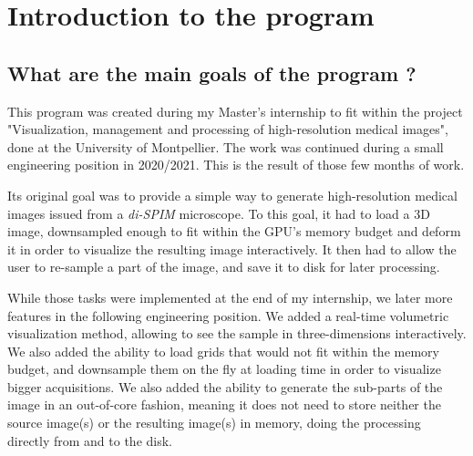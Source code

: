 \chapter{Introduction to the program}\label{text:01_intro}

\begin{comment}
	This section will include :
		- Why this program was created
		- What problems does it tackle / what are its features (very quickly)
		- How to read this manual ?
		- A few definitions
			- notably, the use of certain terms (dataset = 1/multiple 3D image(s))
\end{comment}

\section{What are the main goals of the program ?}\label{text:01_intro:01_goals}
{

	This program was created during my Master's internship to fit within the project "Visualization, management and processing of high-resolution medical images", done at the University of Montpellier. The work was continued during a small engineering position in 2020/2021. This is the result of those few months of work.

	Its original goal was to provide a simple way to generate high-resolution medical images issued from a \textit{di-SPIM} microscope. To this goal, it had to load a 3D image, downsampled enough to fit within the GPU's memory budget and deform it in order to visualize the resulting image interactively. It then had to allow the user to re-sample a part of the image, and save it to disk for later processing.

	While those tasks were implemented at the end of my internship, we later more features in the following engineering position. We added a real-time volumetric visualization method, allowing to see the sample in three-dimensions interactively. We also added the ability to load grids that would not fit within the memory budget, and downsample them on the fly at loading time in order to visualize bigger acquisitions. We also added the ability to generate the sub-parts of the image in an \og{}out-of-core\fg{} fashion, meaning it does not need to store neither the source image(s) or the resulting image(s) in memory, doing the processing directly from and to the disk.
}

